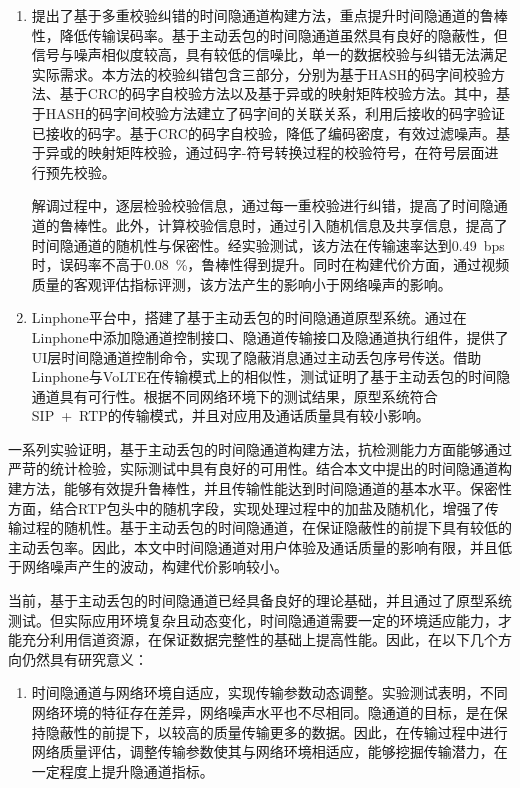 \begin{conclusion}
\begin{enumerate}
    \item
    提出了基于多重校验纠错的时间隐通道构建方法，重点提升时间隐通道的鲁棒性，降低传输误码率。基于主动丢包的时间隐通道虽然具有良好的隐蔽性，但信号与噪声相似度较高，具有较低的信噪比，单一的数据校验与纠错无法满足实际需求。本方法的校验纠错包含三部分，分别为基于HASH的码字间校验方法、基于CRC的码字自校验方法以及基于异或的映射矩阵校验方法。其中，基于HASH的码字间校验方法建立了码字间的关联关系，利用后接收的码字验证已接收的码字。基于CRC的码字自校验，降低了编码密度，有效过滤噪声。基于异或的映射矩阵校验，通过码字-符号转换过程的校验符号，在符号层面进行预先校验。
    
    解调过程中，逐层检验校验信息，通过每一重校验进行纠错，提高了时间隐通道的鲁棒性。此外，计算校验信息时，通过引入随机信息及共享信息，提高了时间隐通道的随机性与保密性。经实验测试，该方法在传输速率达到{0.49\ bps}时，误码率不高于{0.08\ \%}，鲁棒性得到提升。同时在构建代价方面，通过视频质量的客观评估指标评测，该方法产生的影响小于网络噪声的影响。

    \item
    Linphone平台中，搭建了基于主动丢包的时间隐通道原型系统。通过在Linphone中添加隐通道控制接口、隐通道传输接口及隐通道执行组件，提供了UI层时间隐通道控制命令，实现了隐蔽消息通过主动丢包序号传送。借助Linphone与VoLTE在传输模式上的相似性，测试证明了基于主动丢包的时间隐通道具有可行性。根据不同网络环境下的测试结果，原型系统符合SIP\ +\ RTP的传输模式，并且对应用及通话质量具有较小影响。
\end{enumerate}

一系列实验证明，基于主动丢包的时间隐通道构建方法，抗检测能力方面能够通过严苛的统计检验，实际测试中具有良好的可用性。结合本文中提出的时间隐通道构建方法，能够有效提升鲁棒性，并且传输性能达到时间隐通道的基本水平。保密性方面，结合RTP包头中的随机字段，实现处理过程中的加盐及随机化，增强了传输过程的随机性。基于主动丢包的时间隐通道，在保证隐蔽性的前提下具有较低的主动丢包率。因此，本文中时间隐通道对用户体验及通话质量的影响有限，并且低于网络噪声产生的波动，构建代价影响较小。

当前，基于主动丢包的时间隐通道已经具备良好的理论基础，并且通过了原型系统测试。但实际应用环境复杂且动态变化，时间隐通道需要一定的环境适应能力，才能充分利用信道资源，在保证数据完整性的基础上提高性能。因此，在以下几个方向仍然具有研究意义：
\begin{enumerate}
    \item
    时间隐通道与网络环境自适应，实现传输参数动态调整。实验测试表明，不同网络环境的特征存在差异，网络噪声水平也不尽相同。隐通道的目标，是在保持隐蔽性的前提下，以较高的质量传输更多的数据。因此，在传输过程中进行网络质量评估，调整传输参数使其与网络环境相适应，能够挖掘传输潜力，在一定程度上提升隐通道指标。
    

\end{enumerate}
\end{conclusion}
